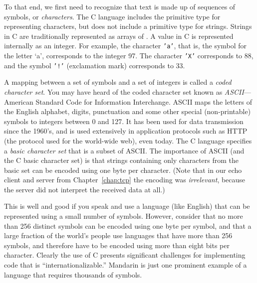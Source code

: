


To that end, we first need to recognize that text is made up of
sequences of symbols, or \emph{characters}.  The C language includes
the primitive type  for representing characters, but does not
include a primitive type for strings.  Strings in C are
traditionally represented as arrays of .
A  value in C is represented internally as an integer.
For example, the character \texttt{'a'}, that is, the symbol for the
letter `a', corresponds to the integer 97.  The character \texttt{'X'}
corresponds to 88, and the symbol \texttt{'!'} (exclamation mark)
corresponds to 33.

A mapping between a set of symbols and a set of integers is called a
\emph{coded character set}.  You may have heard of the
coded character set known as \emph{ASCII}---American Standard Code
for Information Interchange. ASCII maps the letters of the English
alphabet, digits, punctuation and some other special (non-printable)
symbols to integers between 0 and 127.
%
It has been used for data transmission since the 1960's, and is used
extensively in application protocols such as HTTP (the protocol used
for the world-wide web), even today.
%
The C language specifies a \emph{basic character set\/} that is a
subset of ASCII.  The importance of ASCII (and the C basic character
set) is that strings containing only characters from the basic set can
be encoded using one byte per character.  (Note that in 
our echo client and server from
Chapter~\ref{chap:tcp} the encoding was \emph{irrelevant}, because
the server did not interpret the received data at all.)

This is well and good if you speak and use a language (like English)
that can be represented using a small number of symbols.
However, consider that no more than 256 distinct symbols
can be encoded using one byte per symbol, and that
a large fraction of the world's people use languages
that have more than 256 symbols, and therefore have to be encoded using
more than eight bits per character.  Clearly the use of C
presents significant challenges for implementing code that is
``internationalizable.''  Mandarin is just one prominent example of a
language that requires thousands of symbols.

